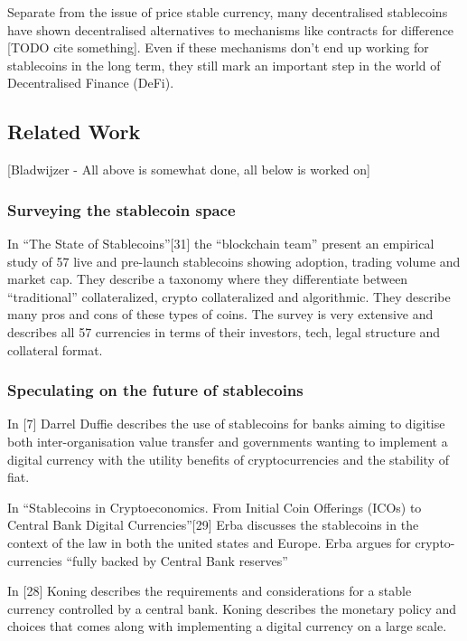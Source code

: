 \documentclass[english,]{IEEEtran}
\begin{document}
Separate from the issue of price stable currency, many decentralised
stablecoins have shown decentralised alternatives to mechanisms like
contracts for difference {[}TODO cite something{]}. Even if these
mechanisms don't end up working for stablecoins in the long term, they
still mark an important step in the world of Decentralised Finance
(DeFi).

\subsection{Related Work}\label{related-work}

{[}Bladwijzer - All above is somewhat done, all below is worked on{]}

\subsubsection{Surveying the stablecoin
space}\label{surveying-the-stablecoin-space}

In ``The State of Stablecoins''{[}31{]} the ``blockchain team'' present
an empirical study of 57 live and pre-launch stablecoins showing
adoption, trading volume and market cap. They describe a taxonomy where
they differentiate between ``traditional'' collateralized, crypto
collateralized and algorithmic. They describe many pros and cons of
these types of coins. The survey is very extensive and describes all 57
currencies in terms of their investors, tech, legal structure and
collateral format.

\subsubsection{Speculating on the future of
stablecoins}\label{speculating-on-the-future-of-stablecoins}

In {[}7{]} Darrel Duffie describes the use of stablecoins for banks
aiming to digitise both inter-organisation value transfer and
governments wanting to implement a digital currency with the utility
benefits of cryptocurrencies and the stability of fiat.

In ``Stablecoins in Cryptoeconomics. From Initial Coin Offerings (ICOs)
to Central Bank Digital Currencies''{[}29{]} Erba discusses the
stablecoins in the context of the law in both the united states and
Europe. Erba argues for crypto-currencies ``fully backed by Central Bank
reserves''

In {[}28{]} Koning describes the requirements and considerations for a
stable currency controlled by a central bank. Koning describes the
monetary policy and choices that comes along with implementing a digital
currency on a large scale.
\end{document}
